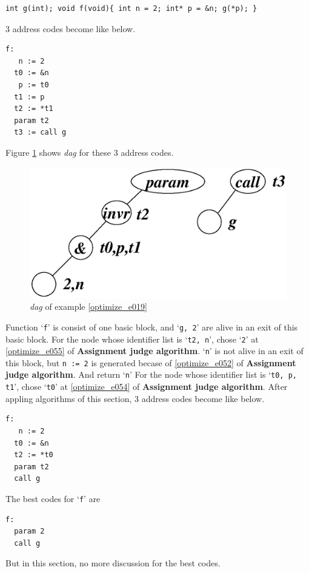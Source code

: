 \begin{Example}
\label{optimize_e019}
\begin{verbatim}
int g(int); void f(void){ int n = 2; int* p = &n; g(*p); }
\end{verbatim}
3 address codes become like below.
\begin{verbatim}
f:
   n := 2
  t0 := &n
   p := t0
  t1 := p
  t2 := *t1
  param t2
  t3 := call g
\end{verbatim}
Figure \ref{optimize_e020} shows {\em dag} for these 3 address codes.
\begin{figure}[htbp]
\begin{center}
\includegraphics[width=1.0\linewidth,height=0.507\linewidth]{opt008.eps}
\caption{{\em dag} of example \ref{optimize_e019}}
\label{optimize_e020}
\end{center}
\end{figure}
Function `{\tt{f}}' is consist of one basic block, and 
`{\tt{g, 2}}' are alive in an exit of this basic block.
For the node whose identifier list is `{\tt{t2, n}}',
chose `{\tt{2}}' at \ref{optimize_e055} of {\bf Assignment judge algorithm}.
`{\tt{n}}' is not alive in an exit of this block,
but {\tt{n := 2}} is generated becase of \ref{optimize_e052}
of {\bf Assignment judge algorithm}. And return `{\tt{n}}'
For the node whose identifier list is `{\tt{t0, p, t1}}',
chose `{\tt{t0}}' at \ref{optimize_e054} of {\bf Assignment judge algorithm}.
After appling algorithms of this section,
3 address codes become like below.
\begin{verbatim}
f:
   n := 2
  t0 := &n
  t2 := *t0
  param t2
  call g
\end{verbatim}
The best codes for `{\tt{f}}' are
\begin{verbatim}
f:
  param 2
  call g
\end{verbatim}
But in this section, no more discussion for the best codes.
\end{Example}

